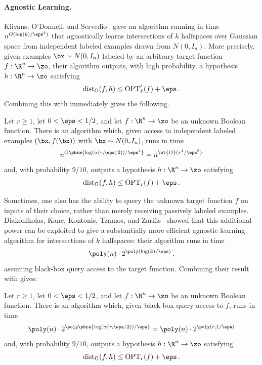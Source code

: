 \documentclass[11pt]{article}
\newcommand{\dG}{\mathrm{dist}_{\mathrm{G}}}
\newcommand{\OPT}{\mathrm{OPT}}
\begin{document}
\paragraph{Agnostic Learning.}

Klivans, O'Donnell, and Servedio~\cite{KOS:08} gave an algorithm running in time $n^{O(\log(k)/\eps^4)}$ that agnostically learns intersections of $k$ halfspaces over Gaussian space from independent labeled examples drawn from $N(0,I_n)$.  
More precisely, given examples $\bx\sim N(0,I_n)$ labeled by an arbitrary target function $f:\R^n\to\zo$, their algorithm outputs, with high probability, a hypothesis $h:\R^n\to\zo$ satisfying
\[
    \dG(f,h)
    \leq
    \OPT'_k(f)+\eps\,.
\] 
Combining this with  immediately gives the following. 

\begin{corollary}
	\label{cor:polytope-learning-examples}
	Let $r\geq1$, let $0<\eps<1/2$, and let $f:\R^n\to\zo$ be an unknown Boolean function. 
	There is an algorithm which, given access to independent labeled examples
	$(\bx,f(\bx))$ with $\bx\sim N(0,I_n)$, runs in time
	\[
		n^{
			O\pbra{
				\log(\alpha(r,\eps/2))/\eps^4
			}
		}
		=
		n^{\wt{O}(r^4/\eps^6)}
	\]
	and, with probability $9/10$, outputs a hypothesis $h:\R^n\to\zo$ satisfying 
	\[
		\dG(f,h)
		\leq
		\OPT_r(f)+\eps\,.
	\]
\end{corollary}

Sometimes, one also has the ability to query the unknown target function $f$ on inputs of their choice, rather than merely receiving passively labeled examples. 
Diakonikolas, Kane, Kontonis, Tzamos, and Zarifis~\cite{DKKTZ23} showed that this additional power can be exploited to give a substantially more efficient agnostic learning algorithm for intersections of $k$ halfspaces: their algorithm runs in time
\[
	\poly(n)\cdot 2^{\poly(\log(k)/\eps)}\,,
\]
assuming black-box query access to the target function. Combining their result with  gives:


\begin{corollary}
	\label{cor:polytope-learning-queries}
	Let $r\geq1$, let $0<\eps<1/2$, and let $f:\R^n\to\zo$ be an unknown
	Boolean function. 
	There is an algorithm which, given black-box query access to $f$, runs in
	time
	\[
		\poly(n)\cdot
		2^{
			\poly\pbra{
				\log(\alpha(r,\eps/2))/\eps
			}
		}
		= \poly(n)\cdot 2^{\poly(r, 1/\eps)}
	\]
	and, with probability $9/10$, outputs a hypothesis $h:\R^n\to\zo$ satisfying
	\[
		\dG(f,h)
		\leq
		\OPT_r(f)+\eps\,.
	\]
\end{corollary}
\end{document}
